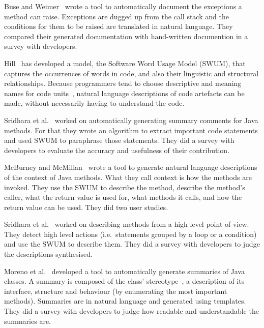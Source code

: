 \documentclass[a4paper,11pt]{sdm_internship}
\theoremstyle{definition}
\begin{document}
Buse and Weimer~\cite{buse2008automatic} wrote a tool to automatically document the exceptions a method can raise.
Exceptions are dugged up from the call stack and the conditions for them to be raised are translated in natural language.
They compared their generated documentation with hand-written documention in a survey with developers.

Hill~\cite{hill2009automatically,hill2010integrating} has developed a model, the Software Word Usage Model (SWUM), that captures the occurrences of words in code, and also their linguistic and structural relationships.
Because programmers tend to choose descriptive and meaning names for code units~\cite{liblit2006cognitive}, natural language descriptions of code artefacts can be made, without necessarily having to understand the code.

Sridhara et al.~\cite{sridhara2010towards,sridhara2012automatic} worked on automatically generating summary comments for Java methods.
For that they wrote an algorithm to extract important code statements and used SWUM to paraphrase those statements.
They did a survey with developers to evaluate the accuracy and usefulness of their contribution.

McBurney and McMillan~\cite{mcburney2016automatic} wrote a tool to generate natural language descriptions of the context of Java methods.
What they call context is how the methods are invoked.
They use the SWUM to describe the method, describe the method's caller, what the return value is used for, what methods it calls, and how the return value can be used.
They did two user studies.

Sridhara et al.~\cite{sridhara2011automatically} worked on describing methods from a high level point of view.
They detect high level actions (i.e.\ statements grouped by a loop or a condition) and use the SWUM to describe them.
They did a survey with developers to judge the descriptions synthesised.

Moreno et al.~\cite{moreno2013automatic} developed a tool to automatically generate summaries of Java classes.
A summary is composed of the class' stereotype~\cite{moreno2012jstereocode}, a description of its interface, structure and behaviour (by enumerating the most important methods).
Summaries are in natural language and generated using templates.
They did a survey with developers to judge how readable and understandable the summaries are.
\end{document}
